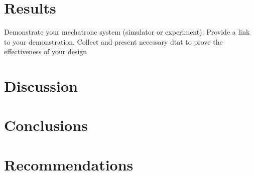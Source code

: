 \documentclass[12pt, letterpaper,titlepage]{article}
\begin{document}
\section{Results}
	Demonstrate your mechatronc system (simulator or experiment). Provide a link to your demonstration. Collect and present necessary dtat to prove the effectiveness of your design

\section{Discussion}

\section{Conclusions}

\section{Recommendations}



\end{document}
